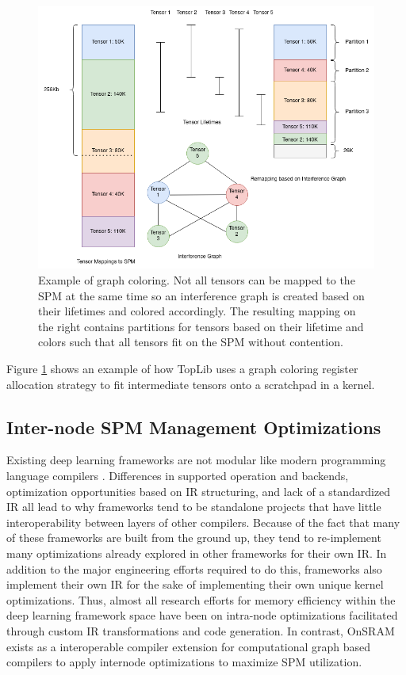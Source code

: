 \begin{figure}[thb!]
\centering
\includegraphics[scale=0.5]{Figures/graph_coloring_example.png}
\decoRule
\caption[SPM Allocation Using Graph Coloring]{Example of graph coloring. Not all tensors can be
mapped to the SPM at the same time so an interference graph is created
based on their lifetimes and colored accordingly. The resulting mapping on the 
right contains partitions for tensors based on their lifetime and colors such that
all tensors fit on the SPM without contention.}
\label{fig:graph_color}
\end{figure}

Figure \ref{fig:graph_color} shows an example of how TopLib \cite{toplib} uses
a graph coloring register allocation strategy to fit intermediate tensors onto
a scratchpad in a kernel.


\subsection{Inter-node SPM Management Optimizations}

Existing deep learning frameworks are not modular like modern programming
language compilers \cite{tensorflow} \cite{TVM} \cite{nGraph}. Differences in
supported operation and backends, optimization opportunities based on IR
structuring, and lack of a standardized IR \cite{nGraph}\cite{DLVM} all lead to
why frameworks tend to be standalone projects that have little interoperability
between layers of other compilers. Because of the fact that many of these
frameworks are built from the ground up, they tend to re-implement many
optimizations already explored in other frameworks for their own IR. In
addition to the major engineering efforts required to do this, frameworks also
implement their own IR for the sake of implementing their own unique kernel
optimizations. Thus, almost all research efforts for memory efficiency within
the deep learning framework space have been on intra-node optimizations
facilitated through custom IR transformations and code generation. In contrast,
OnSRAM exists as a interoperable compiler extension for computational graph
based compilers to apply internode optimizations to maximize SPM utilization.

